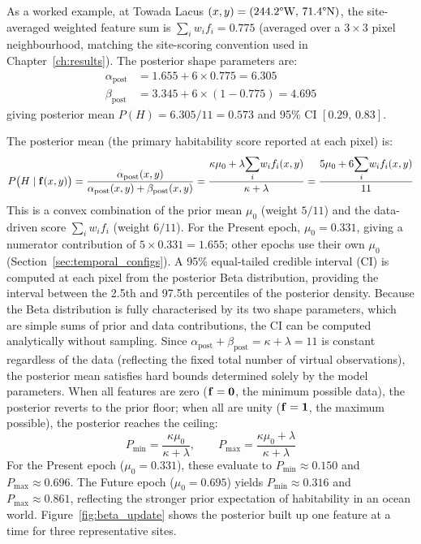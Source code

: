 As a worked example, at Towada Lacus $(x, y) = (244.2\text{\textdegree{}W},\,71.4\text{\textdegree{}N})$, the site-averaged weighted feature sum is $\sum_i w_i f_i = 0.775$ (averaged over a $3\times3$ pixel neighbourhood, matching the site-scoring convention used in Chapter~\ref{ch:results}).  The posterior shape parameters are:
\begin{align*}
  \alpha_\text{post} &= 1.655 + 6 \times 0.775 = 6.305 \\
  \beta_\text{post}  &= 3.345 + 6 \times (1 - 0.775) = 4.695
\end{align*}
giving posterior mean $P(H) = 6.305/11 = 0.573$ and 95\% CI $[0.29,\,0.83]$.

The posterior mean (the primary habitability score reported at each pixel) is:
\begin{equation}
  P\bigl(H \mid \mathbf{f}(x,y)\bigr)
  = \frac{\alpha_\text{post}(x,y)}{\alpha_\text{post}(x,y) + \beta_\text{post}(x,y)}
  = \frac{\kappa\mu_0 + \lambda{\displaystyle\sum_i} w_i f_i(x,y)}{\kappa + \lambda}
  = \frac{5\mu_0 + 6{\displaystyle\sum_i} w_i f_i(x,y)}{11}
  \label{eq:posterior_mean}
\end{equation}
This is a convex combination of the prior mean $\mu_0$ (weight $5/11$) and the data-driven score $\sum_i w_i f_i$ (weight $6/11$).  For the Present epoch, $\mu_0 = 0.331$, giving a numerator contribution of $5 \times 0.331 = 1.655$; other epochs use their own $\mu_0$ (Section~\ref{sec:temporal_configs}).  A 95\% equal-tailed credible interval (CI) is computed at each pixel from the posterior Beta distribution, providing the interval between the 2.5th and 97.5th percentiles of the posterior density.  Because the Beta distribution is fully characterised by its two shape parameters, which are simple sums of prior and data contributions, the CI can be computed analytically without sampling.  Since $\alpha_\text{post} + \beta_\text{post} = \kappa + \lambda = 11$ is constant regardless of the data (reflecting the fixed total number of virtual observations), the posterior mean satisfies hard bounds determined solely by the model parameters.  When all features are zero ($\mathbf{f} = \mathbf{0}$, the minimum possible data), the posterior reverts to the prior floor; when all are unity ($\mathbf{f} = \mathbf{1}$, the maximum possible), the posterior reaches the ceiling:
\begin{equation}
  P_\text{min} = \frac{\kappa\mu_0}{\kappa + \lambda}, \qquad
  P_\text{max} = \frac{\kappa\mu_0 + \lambda}{\kappa + \lambda}
  \label{eq:bounds}
\end{equation}
For the Present epoch ($\mu_0 = 0.331$), these evaluate to $P_\text{min} \approx 0.150$ and $P_\text{max} \approx 0.696$.  The Future epoch ($\mu_0 = 0.695$) yields $P_\text{min} \approx 0.316$ and $P_\text{max} \approx 0.861$, reflecting the stronger prior expectation of habitability in an ocean world.  Figure~\ref{fig:beta_update} shows the posterior built up one feature at a time for three representative sites.

